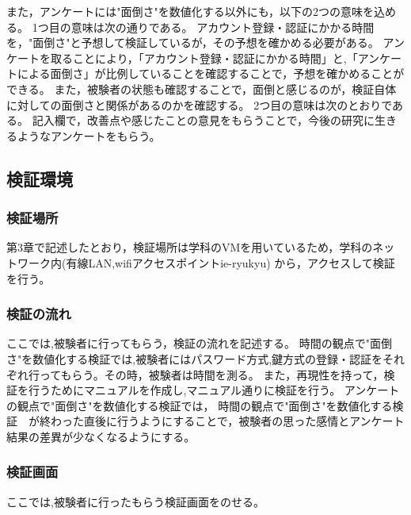 また，アンケートには"面倒さ"を数値化する以外にも，以下の2つの意味を込める。
1つ目の意味は次の通りである。
アカウント登録・認証にかかる時間 を，"面倒さ"と予想して検証しているが，その予想を確かめる必要がある。
アンケートを取ることにより，「アカウント登録・認証にかかる時間」と,「アンケートによる面倒さ」が比例していることを確認することで，予想を確かめることができる。
また，被験者の状態も確認することで，面倒と感じるのが，検証自体に対しての面倒さと関係があるのかを確認する。
2つ目の意味は次のとおりである。
記入欄で，改善点や感じたことの意見をもらうことで，今後の研究に生きるようなアンケートをもらう。








\subsection{検証環境}
 \subsubsection{検証場所}
 第3章で記述したとおり，検証場所は学科のVMを用いているため，学科のネットワーク内(有線LAN,wifiアクセスポイント{ie-ryukyu})
 から，アクセスして検証を行う。



 \subsubsection{検証の流れ}
    ここでは,被験者に行ってもらう，検証の流れを記述する。
    時間の観点で"面倒さ"を数値化する検証では,被験者にはパスワード方式,鍵方式の登録・認証をそれぞれ行ってもらう。その時，被験者は時間を測る。 
    また，再現性を持って，検証を行うためにマニュアルを作成し,マニュアル通りに検証を行う。
    アンケートの観点で"面倒さ"を数値化する検証では，
    時間の観点で"面倒さ"を数値化する検証　が終わった直後に行うようにすることで，被験者の思った感情とアンケート結果の差異が少なくなるようにする。
  

  \subsubsection{検証画面}
    ここでは,被験者に行ったもらう検証画面をのせる。


